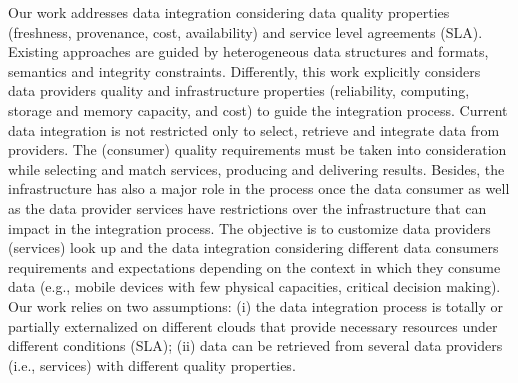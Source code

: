 Our work addresses data integration considering data quality properties (freshness, provenance, cost, availability) and service level agreements (SLA). 
%
Existing approaches are guided by heterogeneous data structures and formats, semantics and integrity constraints.
Differently, this work explicitly considers data providers quality and infrastructure properties (reliability, computing, storage and memory capacity, and cost) to guide the integration process. 
%
Current data integration is not restricted only to select, retrieve and integrate data from providers.
The (consumer) quality requirements must be taken into consideration while selecting and match services, producing and delivering results. Besides, the infrastructure has also a major role in the process once the data consumer as well as the data provider services have restrictions over the infrastructure that can impact in the integration process.  
%
The objective is to customize data providers (services) look up and the data integration considering different data consumers requirements and expectations depending on the context in which  they consume data (e.g., mobile devices with few physical capacities, critical decision making). Our work relies on two assumptions: (i) the data integration process is totally or partially externalized on different clouds that provide necessary resources under different conditions (SLA); (ii) data can be retrieved from several data providers (i.e., services) with different quality properties.

